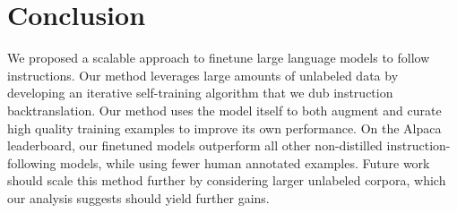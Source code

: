 
\section{Conclusion}
We proposed a scalable approach to finetune large language models to follow instructions. Our method leverages large amounts of unlabeled data by developing an iterative self-training algorithm that we dub instruction backtranslation. Our method uses the model itself to both augment  and curate
high quality training examples to improve its own performance. On the Alpaca leaderboard, our finetuned models outperform all other non-distilled instruction-following models, while using fewer human annotated examples.
Future work should scale this method further by considering larger unlabeled corpora, which our analysis suggests should  yield further gains.